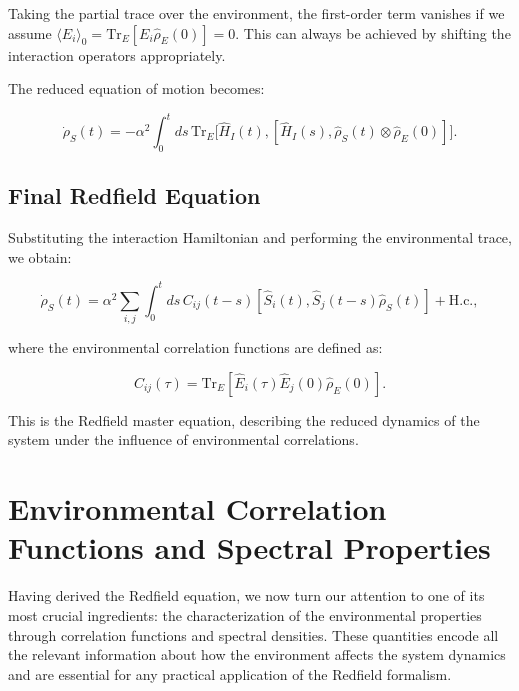Taking the partial trace over the environment, the first-order term vanishes if we assume $\langle E_i \rangle_0 = \mathrm{Tr}_E[E_i \hat{\rho}_E(0)] = 0$. This can always be achieved by shifting the interaction operators appropriately.

The reduced equation of motion becomes:

\begin{equation}
	\dot{\rho}_S(t) = - \alpha^2 \int_0^t ds \, \mathrm{Tr}_E \big[\hat{H}_I(t), [\hat{H}_I(s), \hat{\rho}_S(t) \otimes \hat{\rho}_E(0)]\big].
	\label{eq:Partial_Trace_Derivation}
\end{equation}

\subsection{Final Redfield Equation}

Substituting the interaction Hamiltonian and performing the environmental trace, we obtain:

\begin{equation}
	\dot{\rho}_S(t) = \alpha^2 \sum_{i,j} \int_0^t ds \, C_{ij}(t-s) \left[ \hat{S}_i(t), \hat{S}_j(t-s) \hat{\rho}_S(t) \right] + \text{H.c.},
	\label{eq:Redfield_Equation_Final}
\end{equation}

where the environmental correlation functions are defined as:

\begin{equation}
	C_{ij}(\tau) = \mathrm{Tr}_E[\hat{E}_i(\tau) \hat{E}_j(0) \hat{\rho}_E(0)].
	\label{eq:Environment_Correlation_Function}
\end{equation}

This is the Redfield master equation, describing the reduced dynamics of the system under the influence of environmental correlations.


\section{Environmental Correlation Functions and Spectral Properties}
\label{sec:environmental_correlation_functions}

Having derived the Redfield equation, we now turn our attention to one of its most crucial ingredients: the characterization of the environmental properties through correlation functions and spectral densities. These quantities encode all the relevant information about how the environment affects the system dynamics and are essential for any practical application of the Redfield formalism.

